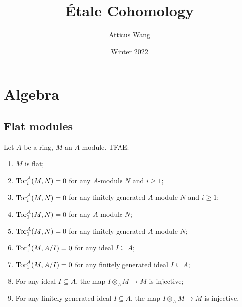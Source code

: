 \documentclass[11pt]{amsart}
\title{\'Etale Cohomology}
\author{Atticus Wang}
\date{Winter 2022}
\begin{document}
\maketitle

\tableofcontents

\newpage


\section{Algebra}

\subsection{Flat modules}


\begin{prop}
    Let $A$ be a ring, $M$ an $A$-module. TFAE:
    \begin{enumerate}
        \item $M$ is flat;
        \item $\operatorname{Tor}_i^A(M,N) = 0$ for any $A$-module $N$ and $i\ge 1$;
        \item $\operatorname{Tor}_i^A(M,N) = 0$ for any finitely generated $A$-module $N$ and $i\ge 1$;
        \item $\operatorname{Tor}_1^A(M,N) = 0$ for any $A$-module $N$;
        \item $\operatorname{Tor}_1^A(M,N) = 0$ for any finitely generated $A$-module $N$;
        \item $\operatorname{Tor}_1^A(M,A/I) = 0$ for any ideal $I\subseteq A$;
        \item $\operatorname{Tor}_1^A(M,A/I) = 0$ for any finitely generated ideal $I\subseteq A$;
        \item For any ideal $I\subseteq A$, the map $I\otimes_A M \to M$ is injective;
        \item For any finitely generated ideal $I\subseteq A$, the map $I\otimes_A M \to M$ is injective.
    \end{enumerate}
\end{prop}
\end{document}
